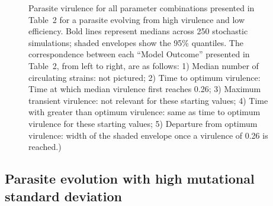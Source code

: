 \documentclass{article}
\begin{document}
\begin{figure}[H]
\caption{Parasite virulence for all parameter combinations presented in Table~2 for a parasite evolving from high virulence and low efficiency. Bold lines represent medians across 250 stochastic simulations; shaded envelopes show the 95\% quantiles. The correspondence between each ``Model Outcome'' presented in Table~2, from left to right, are as follows: 1) Median number of circulating strains: not pictured; 2) Time to optimum virulence: Time at which median virulence first reaches 0.26; 3) Maximum transient virulence: not relevant for these starting values; 4) Time with greater than optimum virulence: same as time to optimum virulence for these starting values; 5) Departure from optimum virulence: width of the shaded envelope once a virulence of 0.26 is reached.)} 
\label{fig:DTS1br}
\end{figure} 
\clearpage

\subsection*{Parasite evolution with high mutational standard deviation}
\end{document}
